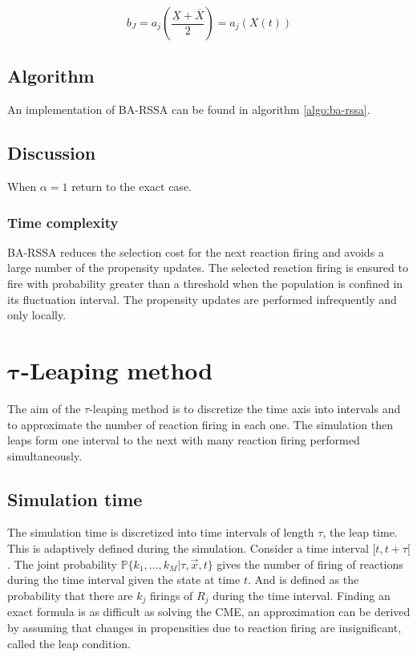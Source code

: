   $$b_J = a_j\left(\frac{\underline{X}+\overline{X}}{2}\right) = a_j(X(t))$$

  \subsection{Algorithm}
  An implementation of BA-RSSA can be found in algorithm \ref{algo:ba-rssa}.

  

  \subsection{Discussion}
  When $\alpha = 1$ return to the exact case.

    \subsubsection{Time complexity}
    BA-RSSA reduces the selection cost for the next reaction firing and avoids a large number of the propensity updates.
    The selected reaction firing is ensured to fire with  probability greater than a threshold when the population is confined in its fluctuation interval.
    The propensity updates are performed infrequently and only locally.


\section{$\mathbf{\tau}$-Leaping method}
The aim of the $\tau$-leaping method is to discretize the time axis into intervals and to approximate the number of reaction firing in each one.
The simulation then leaps form one interval to the next with many reaction firing performed simultaneously.

  \subsection{Simulation time}
  The simulation time is discretized into time intervals of length $\tau$, the leap time.
  This is adaptively defined during the simulation.
  Consider a time interval $[t, t+\tau[$.
  The joint probability $\mathbb{P}\{k_1, \dots, k_M|\tau,\vec{x}, t\}$ gives the number of firing of reactions during the time interval given the state at time $t$.
  And is defined as the probability that there are $k_j$ firings of $R_j$ during the time interval.
  Finding an exact formula is as difficult as solving the CME, an approximation can be derived by assuming that changes in propensities due to reaction firing are insignificant, called the leap condition.

